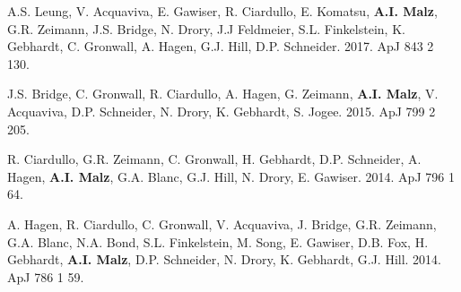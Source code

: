 \begin{list}{\pubnumber{\therefpubnum}}{\malzlist}
\item A.S. Leung, V. Acquaviva, E. Gawiser, R. Ciardullo, E. Komatsu, {\bf A.I. Malz}, G.R. Zeimann, %
J.S. Bridge, N. Drory, J.J Feldmeier, S.L. Finkelstein, K. Gebhardt, C. Gronwall, A. Hagen, G.J. Hill, D.P. Schneider. 
2017. ApJ 843 2 130. 

\item J.S. Bridge, C. Gronwall, R. Ciardullo, A. Hagen, G. Zeimann, {\bf A.I. Malz}, V. Acquaviva, D.P. Schneider, N. Drory, K. Gebhardt, S. Jogee. 2015. ApJ 799 2 205. 

\item R. Ciardullo, G.R. Zeimann, C. Gronwall, H. Gebhardt, D.P. Schneider, A. Hagen, {\bf A.I. Malz}, G.A. Blanc, G.J. Hill, N. Drory, E. Gawiser. 2014. ApJ 796 1 64. 

\item A. Hagen, R. Ciardullo, C. Gronwall, V. Acquaviva, J. Bridge, G.R. Zeimann, G.A. Blanc, N.A. Bond, S.L. Finkelstein, M. Song, E. Gawiser, D.B. Fox, H. Gebhardt, {\bf A.I. Malz}, D.P. Schneider, N. Drory, K. Gebhardt, G.J. Hill. 2014. ApJ 786 1 59. 
  
\end{list}

